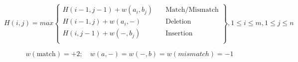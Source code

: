 \begin{figure*}[!t]
  \hfil
\[ H(i,j) = max \left \{
    \begin{array}{lc}
        H(i-1,j-1) + w(a_i,b_j) \quad & \text{Match/Mismatch} \\
        H(i-1,j) + w(a_i,-)     \quad & \text{Deletion}       \\
        H(i,j-1) + w(-,b_j)     \quad & \text{Insertion}      \\
    \end{array} \right\}, 1 \le i \le m, 1 \le j \le n \]

    \[ w(\text{match}) = +2;\quad  w(a,-) = w(-,b) = w(mismatch) = -1 \]
    \hrulefill
\vspace*{4pt}
  \end{figure*}

